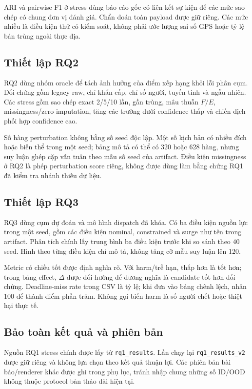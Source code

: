 ARI và pairwise F1 ở stress dùng báo cáo gốc có liên kết sự kiện để các mức sao chép có chung đơn vị đánh giá. Chẩn đoán toàn payload được giữ riêng. Các mức nhiễu là điều kiện thử có kiểm soát, không phải ước lượng sai số GPS hoặc tỷ lệ bản trùng ngoài thực địa.

\subsection{Thiết lập RQ2}
RQ2 dùng nhóm oracle để tách ảnh hưởng của điểm xếp hạng khỏi lỗi phân cụm. Đối chứng gồm legacy raw, chỉ khẩn cấp, chỉ số người, tuyến tính và ngẫu nhiên. Các stress gồm sao chép exact 2/5/10 lần, gần trùng, mâu thuẫn $F/E$, missingness/zero-imputation, tăng các trường dưới confidence thấp và chiến dịch phối hợp confidence cao.

Số hàng perturbation không bằng số seed độc lập. Một số kịch bản có nhiều đích hoặc biến thể trong một seed; bảng mô tả có thể có 320 hoặc 628 hàng, nhưng suy luận ghép cặp vẫn tuân theo mẫu số seed của artifact. Điều kiện missingness ở RQ2 là phép perturbation score riêng, không được dùng làm bằng chứng RQ1 đã kiểm tra nhánh thiếu dữ liệu.

\subsection{Thiết lập RQ3}
RQ3 dùng cụm dự đoán và mô hình dispatch đã khóa. Có ba điều kiện nguồn lực trong một seed, gồm các điều kiện nominal, constrained và surge như tên trong artifact. Phân tích chính lấy trung bình ba điều kiện trước khi so sánh theo 40 seed. Hình theo từng điều kiện chỉ mô tả, không tăng cỡ mẫu suy luận lên 120.

Metric có chiều tốt được định nghĩa rõ. Với harm/trễ hạn, thấp hơn là tốt hơn; trong bảng effect, $\Delta$ được đổi hướng để dương nghĩa là candidate tốt hơn đối chứng. Deadline-miss rate trong CSV là tỷ lệ; khi đưa vào bảng chênh lệch, nhân 100 để thành điểm phần trăm. Không gọi biến harm là số người chết hoặc thiệt hại thực tế.

\subsection{Bảo toàn kết quả và phiên bản}
Nguồn RQ1 stress chính được lấy từ \texttt{rq1\_results}. Lần chạy lại \texttt{rq1\_results\_v2} được giữ riêng và không lựa chọn theo kết quả thuận lợi. Các phiên bản bài báo/renderer khác được ghi trong phụ lục, tránh nhập chung những số ID/OOD không thuộc protocol bản thảo dài hiện tại.

